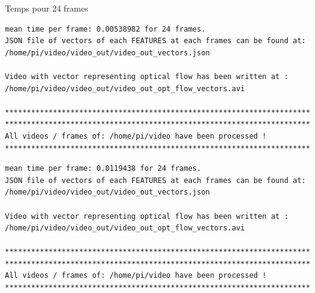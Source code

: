 \documentclass{bredelebeamer}
\begin{document}
\begin{frame}[fragile]{Temps pour 24 frames}

\begin{lstlisting}
mean time per frame: 0.00538982 for 24 frames.
JSON file of vectors of each FEATURES at each frames can be found at: /home/pi/video/video_out/video_out_vectors.json

Video with vector representing optical flow has been written at : /home/pi/video/video_out/video_out_opt_flow_vectors.avi

**********************************************************************
**********************************************************************
All videos / frames of: /home/pi/video have been processed !
**********************************************************************
\end{lstlisting}

\begin{lstlisting}
mean time per frame: 0.0119438 for 24 frames.
JSON file of vectors of each FEATURES at each frames can be found at: /home/pi/video/video_out/video_out_vectors.json

Video with vector representing optical flow has been written at : /home/pi/video/video_out/video_out_opt_flow_vectors.avi

**********************************************************************
**********************************************************************
All videos / frames of: /home/pi/video have been processed !
**********************************************************************
\end{lstlisting}

\end{frame}

\end{document}
